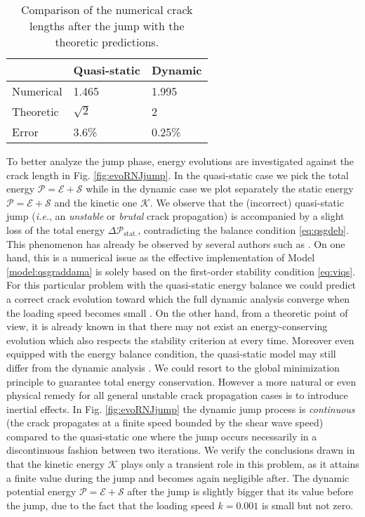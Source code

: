 \begin{table}[htbp]
\centering
\caption{Comparison of the numerical crack lengths after the jump with the theoretic predictions.} \label{tab:compljump}
\begin{tabular}{lll} \toprule
& Quasi-static & Dynamic \\ \midrule
Numerical & 1.465 & 1.995 \\ 
Theoretic & $\sqrt{2}$ & 2 \\ 
Error & 3.6\% & 0.25\% \\ \bottomrule
\end{tabular}
\end{table}

To better analyze the jump phase, energy evolutions are investigated against the crack length in Fig. \ref{fig:evoRNJjump}. In the quasi-static case we pick the total energy $\mathcal{P}=\mathcal{E}+\mathcal{S}$ while in the dynamic case we plot separately the static energy $\mathcal{P}=\mathcal{E}+\mathcal{S}$ and the kinetic one $\mathcal{K}$. We observe that the (incorrect) quasi-static jump (\emph{i.e.}, an \emph{unstable} or \emph{brutal} crack propagation) is accompanied by a slight loss of the total energy $\Delta \mathcal{P}_\mathrm{stat.}$, contradicting the balance condition \eqref{eq:qsgdeb}. This phenomenon has already be observed by several authors such as \cite{BourdinFrancfortMarigo:2008,AmorMarigoMaurini:2009,PhamAmorMarigoMaurini:2011,Bourdin:2011}. On one hand, this is a numerical issue as the effective implementation of Model \ref{model:qsgraddama} is solely based on the first-order stability condition \eqref{eq:viqs}. For this particular problem with the quasi-static energy balance we could predict a correct crack evolution toward which the full dynamic analysis converge when the loading speed becomes small \cite{DumouchelMarigoCharlotte:2008}. On the other hand, from a theoretic point of view, it is already known in \cite{Pham:2010} that there may not exist an energy-conserving evolution which also respects the stability criterion at every time. Moreover even equipped with the energy balance condition, the quasi-static model may still differ from the dynamic analysis \cite{LazzaroniBargelliniDumouchelMarigo:2012}. We could resort to the global minimization principle \cite{BourdinFrancfortMarigo:2008,MesgarnejadBourdinKhonsari:2014} to guarantee total energy conservation. However a more natural or even physical remedy for all general unstable crack propagation cases is to introduce inertial effects. In Fig. \ref{fig:evoRNJjump} the dynamic jump process is \emph{continuous} (the crack propagates at a finite speed bounded by the shear wave speed) compared to the quasi-static one where the jump occurs necessarily in a discontinuous fashion between two iterations. We verify the conclusions drawn in \cite{DumouchelMarigoCharlotte:2008} that the kinetic energy $\mathcal{K}$ plays only a transient role in this problem, as it attains a finite value during the jump and becomes again negligible after. The dynamic potential energy $\mathcal{P}=\mathcal{E}+\mathcal{S}$ after the jump is slightly bigger that its value before the jump, due to the fact that the loading speed $k=0.001$ is small but not zero.

